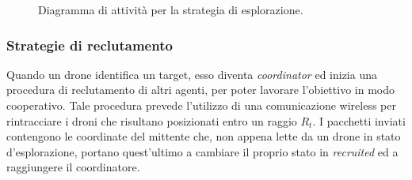 \begin{figure}[H] 
    \captionsetup{justification=centering, margin=2cm, font=footnotesize}
    \begin{center}
    \end{center}
    \caption{Diagramma di attività per la strategia di esplorazione.}
    \label{attivita_exploration}
\end{figure}

\subsubsection{Strategie di reclutamento}

Quando un drone identifica un target, esso diventa \textit{coordinator} ed inizia una procedura di reclutamento di altri agenti, per poter lavorare l'obiettivo in modo cooperativo.
Tale procedura prevede l'utilizzo di una comunicazione wireless per rintracciare i droni che risultano posizionati entro un raggio $R_t$.
I pacchetti inviati contengono le coordinate del mittente che, non appena lette da un drone in stato d'esplorazione, portano quest'ultimo a cambiare il proprio stato in \textit{recruited} ed a raggiungere il coordinatore.

